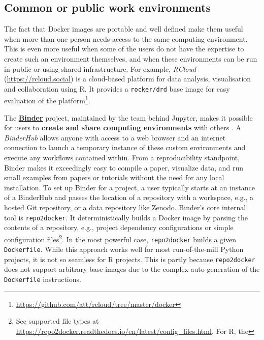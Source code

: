 \hypertarget{common-or-public-work-environments}{%
\subsection{Common or public work
environments}\label{common-or-public-work-environments}}

\label{workenvs}

The fact that Docker images are portable and well defined make them
useful when more than one person needs access to the same computing
environment. This is even more useful when some of the users do not have
the expertise to create such an environment themselves, and when these
environments can be run in public or using shared infrastructure. For
example, \emph{RCloud} (\url{https://rcloud.social}) is a cloud-based
platform for data analysis, visualisation and collaboration using R. It
provides a \texttt{rocker/drd} base image for easy evaluation of the
platform\footnote{\href{https://github.com/att/rcloud/tree/master/docker}{https://github.com/att/rcloud/tree/master/docker}}.

\label{binder} The
\href{https://mybinder.readthedocs.io/en/latest/}{\textbf{Binder}}
project, maintained by the team behind Jupyter, makes it possible for
users to \textbf{create and share computing environments} with others
\citep{jupyter_binder_2018}. A \emph{BinderHub} allows anyone with
access to a web browser and an internet connection to launch a temporary
instance of these custom environments and execute any workflows
contained within. From a reproducibility standpoint, Binder makes it
exceedingly easy to compile a paper, visualize data, and run small
examples from papers or tutorials without the need for any local
installation. To set up Binder for a project, a user typically starts at
an instance of a BinderHub and passes the location of a repository with
a workspace, e.g., a hosted Git repository, or a data repository like
Zenodo. Binder's core internal tool is \texttt{repo2docker}. It
deterministically builds a Docker image by parsing the contents of a
repository, e.g., project dependency configurations or simple
configuration
files\footnote{See supported file types at \href{https://repo2docker.readthedocs.io/en/latest/config\_files.html}{https://repo2docker.readthedocs.io/en/latest/config\_files.html}. For R, the }.
In the most powerful case, \texttt{repo2docker} builds a given
\texttt{Dockerfile}. While this approach works well for most
run-of-the-mill Python projects, it is not so seamless for R projects.
This is partly because \texttt{repo2docker} does not support arbitrary
base images due to the complex auto-generation of the
\texttt{Dockerfile} instructions.

